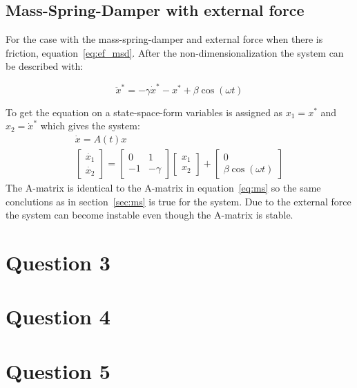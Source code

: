 \documentclass[
  twoside,
  11pt, a4paper,
  footinclude=true,
  headinclude=true,
  cleardoublepage=empty
]{scrbook}
\begin{document}
\section{Mass-Spring-Damper with external force}
For the case with the mass-spring-damper and external force when there is friction, equation~\eqref{eq:ef_msd}. After the non-dimensionalization the system can be described with:

\begin{equation}
	\ddot{x}^*=-\gamma\dot{x}^*-x^*+\beta\cos(\omega t)
\end{equation}

To get the equation on a state-space-form variables is assigned as $x_1=x^*$ and $x_2=\dot{x}^*$ which gives the system:
\begin{equation}
	\begin{gathered}
		\dot{x}=A(t)x\\
		\begin{bmatrix}
			\dot{x_1}\\
			\dot{x_2}
		\end{bmatrix}=\begin{bmatrix}
			0	&	1\\
			-1	&	-\gamma
		\end{bmatrix}\begin{bmatrix}
			x_1\\
			x_2
		\end{bmatrix}+\begin{bmatrix}
			0\\
			\beta \cos(\omega t)
		\end{bmatrix}
	\end{gathered}
\end{equation}
The A-matrix is identical to the A-matrix in equation~\eqref{eq:ms} so the same conclutions as in section~\ref{sec:ms} is true for the system. Due to the external force the system can become instable even though the A-matrix is stable.

\chapter{Question 3}


\chapter{Question 4}


\chapter{Question 5}



    
\end{document}

